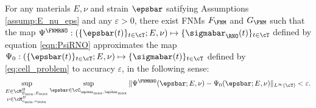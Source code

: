 \documentclass[letterpaper,11pt]{article}
\begin{document}
\begin{theorem}
    For any materials $E, \nu$ and strain $\epsbar$ satifying Assumptions \ref{assump:E_nu_eps} and any $\varepsilon > 0$, there exist FNMs $F_{\FNM}$ and $G_{\FNM}$ such that the map $\Psi^{\FNMRNO}: \left(\{\epsbar(t)\}_{t \in \cT}; E, \nu\right) \mapsto \{\sigmabar_{\RNO}(t)\}_{t \in \cT}$ defined by equation \eqref{eqn:PsiRNO} approximates the map $\Psi_0: \left(\{\epsbar(t)\}_{t\in\cT}; E, \nu\right) \mapsto \{\sigmabar(t)\}_{t \in \cT}$ defined by \eqref{eq:cell_problem} to accuracy $\varepsilon$, in the following sense:
    \begin{equation}
        \sup_{\substack{E \in \cM_{E_{\min}, E_{\max}}^B\\ \nu \in \cM_{\nu_{\min}, \nu_{\max}}^B}}\sup_{\epsbar \in \cC_{\epsbar_{\max}, \dot{\epsbar}_{\max}}} \|\Psi^{\FNMRNO}(\epsbar; E, \nu) - \Psi_0(\epsbar; E, \nu)\|_{L^\infty(\cT)} < \varepsilon.
    \end{equation}
\end{theorem}
\end{document}
